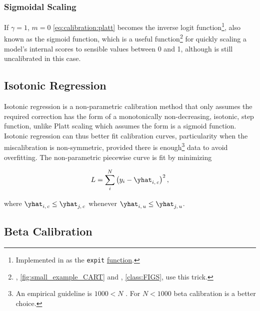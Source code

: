 \subsubsection{Sigmoidal Scaling}
\label{ml_general:calibration:platt:sigmoid}

If $\gamma = 1$, $m = 0$ \cref{eq:calibration:platt} becomes the
inverse logit function\footnote{Implemented in \scipy as the
\texttt{expit} \href{https://docs.scipy.org/doc/scipy/reference/generated/scipy.special.expit.html}{function}.},
also known as the sigmoid function,
which is a useful function\footnote{\xgboost, \cref{fig:small_example_CART}
and \figs, \cref{class:FIGS}, use this trick.} for
quickly scaling a model's internal scores to
sensible values between \num{0} and \num{1},
although \yhat is still uncalibrated in this case.

\subsection{Isotonic Regression}
\label{ml_general:calibration:isotonic_regression}

Isotonic regression \cite{isotonic_calib} is a non-parametric calibration method
that only assumes the required correction has the form of a monotonically non-decreasing, \ie isotonic, step function,
unlike Platt scaling which assumes the form is a sigmoid function.
Isotonic regression can thus better fit calibration curves,
particularity when the miscalibration is non-symmetric,
provided there is enough\footnote{An empirical guideline is $\num{1000} < N$ \cite{10.1145/1102351.1102430}.
For $N < \num{1000}$ beta calibration is a better choice.} data to avoid overfitting.
The non-parametric piecewise curve is fit by minimizing

\begin{equation} \label{eq:calibration:isotonic_regression}
L = \sum_{i}^{N} \left(y_{i} - \yhat_{i,\,c} \right)^{2},
\end{equation}

\noindent where $\yhat_{i,\,c} \leq \yhat_{j,\,c}$
whenever $\yhat_{i,\,u} \leq \yhat_{j,\,u}$.

\subsection{Beta Calibration}
\label{ml_general:calibration:beta_calib}

